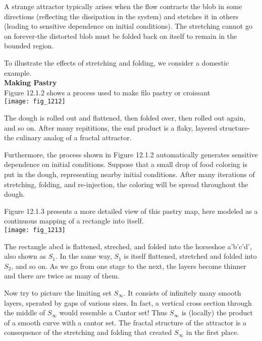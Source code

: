 \documentclass{article}
\newcommand\tab[1][1cm]{\hspace*{#1}}
\begin{document}
A strange attractor typically arises when the flow contracts the blob in some directions (reflecting the dissipation in the system) and stetches it in others (leading to sensitive dependence on initial conditions). The stretching cannot go on forever-the distorted blob must be folded back on itself to remain in the bounded region. \\ \tab

To illustrate the effects of stretching and folding, we consider a domestic example. \\

\textbf {Making Pastry} \\

Figure 12.1.2 shows a process used to make filo pastry or croissant \\

\texttt{[image: fig\_1212]}

The dough is rolled out and flattened, then folded over, then rolled out again, and so on. After many repititions, the end product is a flaky, layered structure-the culinary analog of a fractal attractor. \\ \tab

Furthermore, the process shown in Figure 12.1.2 automatically generates sensitive dependence on initial conditions. Suppose that a small drop of food coloring is put in the dough, representing nearby initial conditions. After many iterations of stretching, folding, and re-injection, the coloring will be spread throughout the dough. \\ \tab

Figure 12.1.3 presents a more detailed view of this pastry map, here modeled as a continuous mapping of a rectangle into itself. \\

\texttt{[image: fig\_1213]}

The rectangle abcd is flattened, streched, and folded into the horseshoe a'b'c'd', also shown as $S_{1}$. In the same way, $S_{1}$ is itself flattened, stretched and folded into $S_{2}$, and so on. As we go from one stage to the next, the layers become thinner and there are twice as many of them. \\ \tab

Now try to picture the limiting set $S_{\infty}$. It consists of infinitely many smooth layers, sperated by gaps of various sizes. In fact, a vertical cross section through the middle of $S_{\infty}$ would resemble a Cantor set! Thus $S_{\infty}$ is (locally) the product of a smooth curve with a cantor set. The fractal structure of the attractor is a consequence of the stretching and folding that created $S_{\infty}$ in the first place. \\
\end{document}
